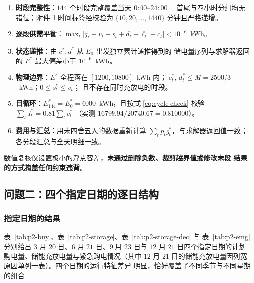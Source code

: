 \begin{enumerate}
  \item \textbf{时段完整性}：$144$ 个时段完整覆盖当天 $0{:}00$--$24{:}00$，
        首尾与四小时分组均无错位；附件 1 时间标签经校验为
        $\{10,20,\dots,1440\}$ 分钟且严格递增。
  \item \textbf{逐段供需平衡}：$\max_t\bigl|g_t+v_t-s_t+d_t-\ell_t-c_t\bigr|
        < 10^{-6}$~kWh。
  \item \textbf{状态递推}：由 $c^*,d^*$ 从 $E_0$ 出发独立累计递推得到的
        储电量序列与求解器返回的 $E^*$ 最大偏差小于 $10^{-6}$~kWh。
  \item \textbf{物理边界}：$E^*$ 全程落在 $[1200,10800]$~kWh 内；
        $c_t^*,\,d_t^* \le M = 2500/3$~kWh；$0 \le s_t^* \le v_t$；
        且不存在同时充放电的时段。
  \item \textbf{日循环}：$E_{144}^* = E_0^* = 6000$~kWh，且按式
        \eqref{eq:cycle-check} 校验 $\sum_t d_t^* = 0.81\sum_t c_t^*$
        （实测 $16799.94 / 20740.67 = 0.810000$）。
  \item \textbf{费用与汇总}：用未四舍五入的数据重新计算
        $\sum_t p_t g_t^*$，与求解器返回值一致；各分段汇总与全天明细一致。
\end{enumerate}

数值复核仅设置极小的浮点容差，\textbf{未通过删除负数、裁剪越界值或修改末段
结果的方式掩盖任何约束违背}。

\subsection{问题二：四个指定日期的逐日结构}
\label{app:p2-dates}

\subsubsection{指定日期的结果}

表~\ref{tab:p2-buy}、表~\ref{tab:p2-storage}、表~\ref{tab:p2-storage-dec} 与
表~\ref{tab:p2-emg} 分别给出 $3$ 月 $20$ 日、$6$ 月 $21$ 日、$9$ 月 $23$ 日与
$12$ 月 $21$ 日四个指定日期的计划购电量、储能充放电量与紧急购电情况（其中
$12$ 月 $21$ 日的储能充放电量因列宽原因单列一表）。四个日期的运行特征差异
明显，恰好覆盖了不同季节与不同星期的组合：

